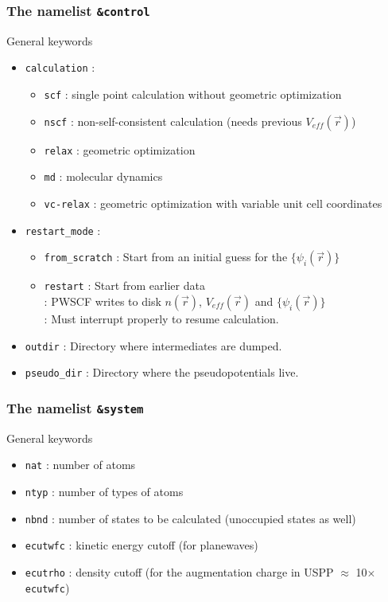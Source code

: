 \documentclass[]{beamer}
\newcommand{\blue}{\color{blue}}
\def\t#1{{\texttt{#1}}}
\def\vr{\vec{r}}
\begin{document}
\begin{frame}
\frametitle{The namelist \texttt{\&control} }
\begin{block}{General keywords}
\begin{itemize}
\item<1->\t{calculation} : 
\begin{itemize}
  \item[] \t{scf} : single point calculation without geometric optimization 
  \item[] \t{nscf} : non-self-consistent calculation (needs previous $V_{eff}(\vr)$)
  \item[] \t{relax} : geometric optimization
  \item[] \t{md} : molecular dynamics
  \item[] \t{vc-relax} : geometric optimization with variable unit cell
  coordinates
\end{itemize}
\item<2->\t{restart\_mode} :
\begin{itemize} 
\item[] \t{from\_scratch} : Start from an initial guess for the $\{\psi_i(\vr)\}$
\item[] \t{restart} : Start from earlier data \\
{\blue{Note 1}} : PWSCF writes to disk $n(\vr)$, $V_{eff}(\vr)$ and $\{\psi_i(\vr)\}$\\
{\blue{Note 2}} : Must interrupt properly to resume calculation.\\
\end{itemize}
\item<3-> \t{outdir} : Directory where intermediates are dumped.
\item<4-> \t{pseudo\_dir} : Directory where the pseudopotentials live.
\end{itemize}
\end{block}
\end{frame}

\begin{frame}
  \frametitle{The namelist \t{\&system}}
  \begin{block}{General keywords}
    \begin{itemize}
      \item<1-> \t{nat} : number of atoms
      \item<1-> \t{ntyp} : number of types of atoms
      \item<2-> \t{nbnd} : number of states to be calculated (unoccupied states
      as well)
      \item<3-> \t{ecutwfc} : kinetic energy cutoff (for planewaves)
      \item<3-> \t{ecutrho} : density cutoff (for the augmentation charge in
      USPP $\approx$ 10$\times$ \t{ecutwfc})
    \end{itemize}
  \end{block}
\end{frame}
\end{document}
